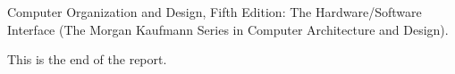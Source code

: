 \documentclass[10pt]{article}
\begin{document}
\begin{thebibliography}{}
    \bibitem{} Computer Organization and Design, Fifth Edition: The Hardware/Software Interface (The Morgan Kaufmann Series in Computer Architecture and Design).

\end{thebibliography}
    
\begin{center}\begin{Large}
    This is the end of the report.
\end{Large} \end{center}
\end{document}
